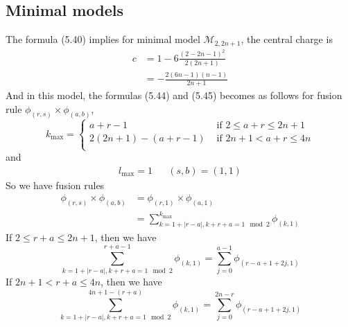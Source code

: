 \subsection{Minimal models}
The formula (5.40) implies for minimal model $\mathcal{M}_{2,2n+1}$, the central charge is 
\[
\begin{aligned}
c & = 1 - 6 \frac{(2-2n-1)^2}{2(2n+1)}\\
& =  - \frac{2(6n-1)(n-1)}{2n+1}
\end{aligned}
\]
And in this model, the formulas (5.44) and (5.45) becomes as follows for fusion rule $\phi_{(r,s)} \times \phi_{(a,b)}$,
\[
k_{\text{max}} = \begin{cases}
a+r -1 & \text{ if } 2 \leq a+r \leq 2n+1\\
2(2n+1) -(a+r-1) & \text{ if } 2n+1 < a+r \leq 4n\\
\end{cases}
\]
and 
\[
\begin{aligned}
l_{\text{max}} = 1& &(s,b)=(1,1)
\end{aligned}
\]
So we have fusion rules
\[
\begin{aligned}
 \phi_{(r,s)} \times \phi_{(a,b)} & = \phi_{(r,1)} \times \phi_{(a,1)} \\
 & = \sum_{k=1+|r-a|,k+r+a =1 \mod 2}^{k_{\text{max}}} \phi_{(k,1)}
\end{aligned}
\]
If $2 \leq r+a \leq 2n+1$, then we have
\[
\sum_{k=1+|r-a|,k+r+a =1 \mod 2}^{r+a-1} \phi_{(k,1)} = \sum_{j=0}^{a-1} \phi_{(r-a+1 + 2j,1)}
\]
If $2n+1 < r+a \leq 4n$, then we have 
\[
\sum_{k=1+|r-a|,k+r+a =1 \mod 2}^{4n+1-(r+a)} \phi_{(k,1)} = \sum_{j=0}^{2n-r} \phi_{(r-a+1 + 2j,1)}
\]
